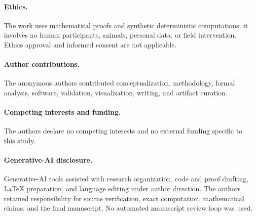 \paragraph{Ethics.}
The work uses mathematical proofs and synthetic deterministic computations;
it involves no human participants, animals, personal data, or field
intervention.  Ethics approval and informed consent are not applicable.

\paragraph{Author contributions.}
The anonymous authors contributed conceptualization, methodology, formal
analysis, software, validation, visualization, writing, and artifact curation.

\paragraph{Competing interests and funding.}
The authors declare no competing interests and no external funding specific
to this study.

\paragraph{Generative-AI disclosure.}
Generative-AI tools assisted with research organization, code and proof
drafting, LaTeX preparation, and language editing under author direction.
The authors retained responsibility for source verification, exact
computation, mathematical claims, and the final manuscript.  No automated
manuscript review loop was used.
